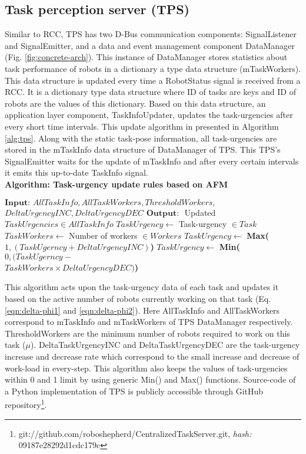 \subsection{Task perception server (TPS)}
Similar to RCC,  TPS has two D-Bus communication components: SignalListener and SignalEmitter, and a data and event management component DataManager (Fig. \ref{fig:concrete-arch}). This instance of DataManager stores statistics about task performance of robots in a dictionary a type data structure (mTaskWorkers). This data structure is updated every time a RobotStatus signal is received from a RCC. It is a dictionary type data structure where ID of tasks are keys and ID of robots are the values of this dictionary. Based on this data structure, an application layer component, TaskInfoUpdater, updates the task-urgencies after every short time intervals. This update algorithm in presented in Algorithm \ref{alg:tps}.  Along with the static task-pose information, all task-urgencies are stored in the mTaskInfo data structure of  DataManager of TPS. This TPS's SignalEmitter waits for the update of mTaskInfo and after every certain intervals it emits this up-to-date TaskInfo signal.\\
\textbf{Algorithm: Task-urgency update rules  based on AFM}
\begin{algorithmic}[1]
\begin{small}
\label{alg:tps}
\State $\textbf{Input: } AllTaskInfo, AllTaskWorkers, ThresholdWorkers,$\\ \hspace*{1cm}$DeltaUrgencyINC, DeltaUrgencyDEC$
\State $\textbf{Output: }$ Updated $TaskUrgencies \in AllTaskInfo$
\State $ TaskUrgency \gets  $ Task-urgency $\in Task$
\State $ TaskWorkers \gets  $   Number of workers $ \in Workers$
\State $ TaskUrgency \gets $ \textbf{Max(}$1, (TaskUgerncy + DeltaUrgencyINC)$\textbf{)}
\Else
\State $ TaskUrgency \gets $ \textbf{Min(}$0, (TaskUgerncy - $\\ \hspace*{5.3cm}$ TaskWorkers  \times DeltaUrgencyDEC)$\textbf{)}
\EndIf
\EndFor
\end{small}
\end{algorithmic}
This algorithm acts upon the task-urgency data of each task and updates it based on the active number of robots currently working on that task (Eq. \ref{eqn:delta-phi1} and \ref{eqn:delta-phi2}). Here AllTaskInfo and AllTaskWorkers  correspond to  mTaskInfo and mTaskWorkers of TPS DataManager respectively.  ThresholdWorkers are the minimum number of robots required to work on this task ($\mu$). DeltaTaskUrgencyINC and DeltaTaskUrgencyDEC are the task-urgency increase and decrease rate which correspond to the small increase and decrease of work-load in every-step. This algorithm also keeps the values of task-urgencies within 0 and 1 limit by using generic Min() and Max() functions. Source-code of a Python implementation of TPS is publicly accessible through GitHub repository\footnote{git://github.com/roboshepherd/CentralizedTaskServer.git,  \textit{hash:} 09187e28292d1cdc179c}.
